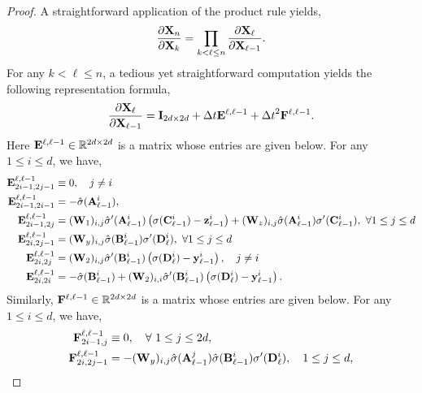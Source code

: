 \documentclass{article} \usepackage{iclr2022_conference,times}
\newcommand{\by}{{\bf y}}
\newcommand{\bz}{{\bf z}}
\newcommand{\bW}{{\bf W}}
\newcommand{\bA}{{\bf A}}
\newcommand{\bX}{{\bf X}}
\newcommand{\bB}{{\bf B}}
\newcommand{\bC}{{\bf C}}
\newcommand{\R}{{\mathbb R}}
\newcommand{\Dt}{{\Delta t}}
\newcommand{\bF}{{\bf F}}
\newcommand{\bD}{{\bf D}}
\newcommand{\bE}{{\bf E}}
\begin{document}
\begin{proof}
A straightforward application of the product rule yields,
\begin{equation}
\label{eq:grad5}
 \frac{\partial \bX_n}{\partial \bX_k} = \prod\limits_{k < \ell \leq n} \frac{\partial \bX_\ell}{\partial \bX_{\ell-1}} .
\end{equation}
For any $k < \ell \leq n$, a tedious yet straightforward computation yields the following representation formula,
\begin{equation}
    \label{eq:grad6}
    \frac{\partial \bX_\ell}{\partial \bX_{\ell-1}} = {\bf I}_{2d \times 2d} + \Dt \bE^{\ell,\ell-1} + \Dt^2 \bF^{\ell,\ell-1}.
\end{equation}
Here $\bE^{\ell,\ell-1} \in \R^{2d \times 2d}$ is a matrix whose entries are given below. For any $1 \leq i \leq d$, we have,
\begin{equation}
    \label{eq:grad7}
    \begin{aligned}
    \bE^{\ell,\ell-1}_{2i-1,2j-1} &\equiv 0, \quad j \neq i\\
    \bE^{\ell,\ell-1}_{2i-1,2i-1} &= - \hat{\sigma}(\bA^i_{\ell-1}), \\
    \bE^{\ell,\ell-1}_{2i-1,2j} &= (\bW_1)_{i,j}\hat{\sigma}^{\prime}(\bA^i_{\ell-1})\left(\sigma(\bC^i_{\ell-1})-\bz^i_{\ell-1}\right) + (\bW_z)_{i,j} \hat{\sigma}(\bA^i_{\ell-1})\sigma^{\prime}(\bC^i_{\ell-1}),~\forall 1 \leq j \leq d \\
    \bE^{\ell,\ell-1}_{2i,2j-1} &= (\bW_y)_{i,j} \hat{\sigma}(\bB^i_{\ell-1})\sigma^{\prime}(\bD^i_{\ell}), ~\forall 1 \leq j \leq d  \\
    \bE^{\ell,\ell-1}_{2i,2j} &= (\bW_2)_{i,j}\hat{\sigma}^{\prime}(\bB^i_{\ell-1})\left(\sigma(\bD^i_{\ell}) - \by^i_{\ell-1}\right), \quad j \neq i \\
    \bE^{\ell,\ell-1}_{2i,2i} &= -\hat{\sigma}(\bB^i_{\ell-1}) +  (\bW_2)_{i,i}\hat{\sigma}^{\prime}(\bB^i_{\ell-1})\left(\sigma(\bD^i_{\ell}) - \by^i_{\ell-1}\right). 
      \end{aligned}
\end{equation}
Similarly, $\bF^{\ell,\ell-1} \in \R^{2d \times 2d}$ is a matrix whose entries are given below. For any $1 \leq i \leq d$, we have,
\begin{equation}
    \label{eq:grad8}
    \begin{aligned}
    \bF^{\ell,\ell-1}_{2i-1,j} &\equiv 0, \quad \forall~1\leq j \leq 2d, \\
    \bF^{\ell,\ell-1}_{2i,2j-1} &= - (\bW_y)_{i,j}\hat{\sigma}(\bA^j_{\ell-1})\hat{\sigma}(\bB^i_{\ell-1})\sigma^{\prime}(\bD^i_{\ell}), \quad 1 \leq j \leq d, \\

\end{aligned}
\end{equation}
\end{proof}
\end{document}

